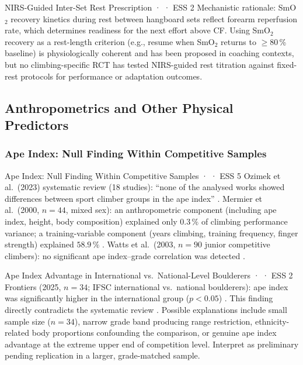 \begin{bioplausbox}{NIRS-Guided Inter-Set Rest Prescription · \bioplausible · ESS 2}
Mechanistic rationale: SmO$_2$ recovery kinetics during rest between hangboard sets reflect forearm reperfusion rate, which determines readiness for the next effort above CF.
Using SmO$_2$ recovery as a rest-length criterion (e.g., resume when SmO$_2$ returns to $\geq$80\,\% baseline) is physiologically coherent and has been proposed in coaching contexts, but no climbing-specific RCT has tested NIRS-guided rest titration against fixed-rest protocols for performance or adaptation outcomes.
\end{bioplausbox}

\subsection{Anthropometrics and Other Physical Predictors}
\label{sec:anthropometrics}

\subsubsection{Ape Index: Null Finding Within Competitive Samples}

\begin{evidencebox}{Ape Index: Null Finding Within Competitive Samples · \evidencebacked · ESS 5}
Ozimek et al.\ (2023) systematic review (18 studies): ``none of the analysed works showed differences between sport climber groups in the ape index'' \cite{TEMP_Ozimek2023}.
Mermier et al.\ (2000, $n = 44$, mixed sex): an anthropometric component (including ape index, height, body composition) explained only $0.3\,\%$ of climbing performance variance; a training-variable component (years climbing, training frequency, finger strength) explained $58.9\,\%$ \cite{MJPS00}.
Watts et al.\ (2003, $n = 90$ junior competitive climbers): no significant ape index--grade correlation was detected \cite{WJL+03}.
\end{evidencebox}

\begin{toverifybox}{Ape Index Advantage in International vs.\ National-Level Boulderers · \toverify · ESS 2}
Frontiers (2025, $n = 34$; IFSC international vs.\ national boulderers): ape index was significantly higher in the international group ($p < 0.05$) \cite{DTB+25}.
This finding directly contradicts the systematic review \cite{TEMP_Ozimek2023}.
Possible explanations include small sample size ($n = 34$), narrow grade band producing range restriction, ethnicity-related body proportions confounding the comparison, or genuine ape index advantage at the extreme upper end of competition level.
Interpret as preliminary pending replication in a larger, grade-matched sample.
\end{toverifybox}

